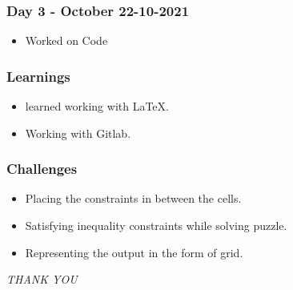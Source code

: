 \documentclass[14pt]{beamer}
\begin{document}
\begin{frame}
     \frametitle{Day 3 - October 22-10-2021}
    \begin{figure}
   \end{figure}
    \begin{itemize}
       \item Worked on Code
   \end{itemize}
\end{frame}
\begin{frame}
  \frametitle{Learnings}
  \begin{itemize}
      \item learned working with LaTeX.
      \item Working with Gitlab.
   \end{itemize}
\end{frame}
\begin{frame}
  \frametitle{Challenges}
    \begin{itemize}
        \item Placing the constraints in between the cells.
        \item Satisfying inequality constraints while solving puzzle.
        \item Representing the output in the form of grid.
    \end{itemize}
\end{frame}
\begin{frame}
     \centering \Huge
     \emph{THANK YOU}
\end{frame}
 
\end{document}
